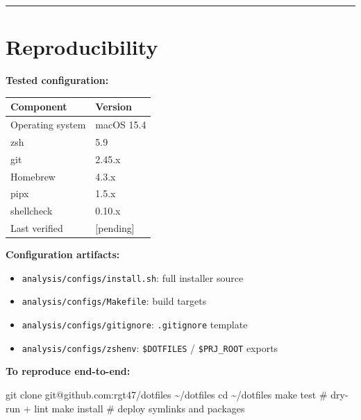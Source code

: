 \documentclass[
  11pt,
  letterpaper,
  DIV=11,
  numbers=noendperiod]{scrartcl}
\newenvironment{Shaded}{\begin{snugshade}}{\end{snugshade}}
\newcommand{\BuiltInTok}[1]{\textcolor[rgb]{0.00,0.23,0.31}{#1}}
\newcommand{\CommentTok}[1]{\textcolor[rgb]{0.37,0.37,0.37}{#1}}
\newcommand{\FunctionTok}[1]{\textcolor[rgb]{0.28,0.35,0.67}{#1}}
\newcommand{\NormalTok}[1]{\textcolor[rgb]{0.00,0.23,0.31}{#1}}
\newcounter{none} %
\providecommand{\tightlist}{%
  \setlength{\itemsep}{0pt}\setlength{\parskip}{0pt}}
\begin{document}
\begin{center}\rule{0.5\linewidth}{0.5pt}\end{center}

\section{Reproducibility}\label{reproducibility}

\textbf{Tested configuration:}

{\def\LTcaptype{none} %
\begin{longtable}[]{@{}ll@{}}
\toprule\noalign{}
Component & Version \\
\midrule\noalign{}
\endhead
\bottomrule\noalign{}
\endlastfoot
Operating system & macOS 15.4 \\
zsh & 5.9 \\
git & 2.45.x \\
Homebrew & 4.3.x \\
pipx & 1.5.x \\
shellcheck & 0.10.x \\
Last verified & {[}pending{]} \\
\end{longtable}
}

\textbf{Configuration artifacts:}

\begin{itemize}
\tightlist
\item
  \texttt{analysis/configs/install.sh}: full installer source
\item
  \texttt{analysis/configs/Makefile}: build targets
\item
  \texttt{analysis/configs/gitignore}: \texttt{.gitignore} template
\item
  \texttt{analysis/configs/zshenv}: \texttt{\$DOTFILES} /
  \texttt{\$PRJ\_ROOT} exports
\end{itemize}

\textbf{To reproduce end-to-end:}

\begin{Shaded}
\begin{Highlighting}[]
\FunctionTok{git}\NormalTok{ clone git@github.com:rgt47/dotfiles \textasciitilde{}/dotfiles}
\BuiltInTok{cd}\NormalTok{ \textasciitilde{}/dotfiles}
\FunctionTok{make}\NormalTok{ test       }\CommentTok{\# dry{-}run + lint}
\FunctionTok{make}\NormalTok{ install    }\CommentTok{\# deploy symlinks and packages}
\end{Highlighting}
\end{Shaded}
\end{document}
